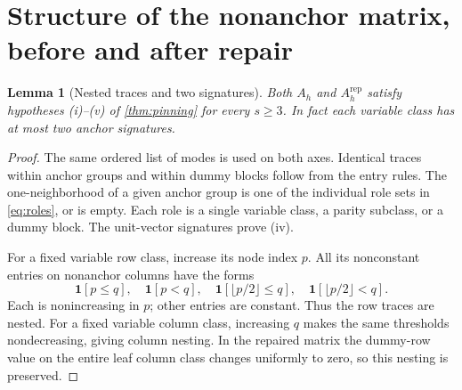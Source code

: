 \documentclass[11pt]{article}
\newtheorem{lemma}[theorem]{Lemma}
\theoremstyle{definition}
\newcommand{\one}{\mathbf 1}
\begin{document}
\section{Structure of the nonanchor matrix, before and after repair}
\label{sec:structure}

\begin{lemma}[Nested traces and two signatures]
\label{lem:signatures}
Both \(A_h\) and \(A_h^{\mathrm{rep}}\) satisfy hypotheses
\textnormal{(i)--(v)} of \cref{thm:pinning} for every \(s\ge3\).
In fact each variable class has at most two anchor signatures.
\end{lemma}
\begin{proof}
The same ordered list of modes is used on both axes. Identical traces
within anchor groups and within dummy blocks follow from the entry rules.
The one-neighborhood of a given anchor group is
one of the individual role sets in \eqref{eq:roles}, or is empty.
Each role is a single variable class, a parity subclass, or a dummy
block. The unit-vector signatures prove (iv).

For a fixed variable row class, increase its node index \(p\).
All its nonconstant entries on nonanchor columns have the forms
\[
 \one[p\le q],\quad\one[p<q],\quad
 \one[\lfloor p/2\rfloor\le q],\quad
 \one[\lfloor p/2\rfloor<q].
\]
Each is nonincreasing in \(p\); other entries are constant. Thus the
row traces are nested. For a fixed variable column class, increasing
\(q\) makes the same thresholds nondecreasing, giving column nesting.
In the repaired matrix the dummy-row value on the entire leaf column
class changes uniformly to zero, so this nesting is preserved.


\end{proof}
\end{document}
